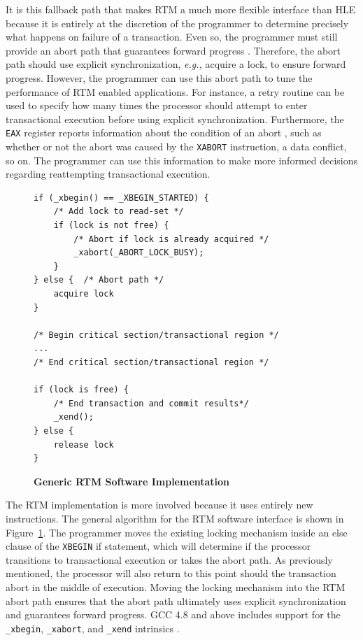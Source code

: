 \documentclass{sig-alternate}
\begin{document}
It is this fallback path that makes RTM a much more flexible interface than HLE because it
is entirely at the discretion of the programmer to determine precisely what happens on
failure of a transaction.  Even so, the programmer must still provide an abort path that
guarantees forward progress \cite{intel_prog_ref}.  Therefore, the abort path should use
explicit synchronization, \emph{e.g.,} acquire a lock, to ensure forward progress.
However, the programmer can use this abort path to tune the performance of RTM enabled
applications.  For instance, a retry routine can be used to specify how many times the
processor should attempt to enter transactional execution before using explicit
synchronization.  Furthermore, the \texttt{EAX} register reports information about the
condition of an abort \cite{intel_prog_ref}, such as whether or not the abort was caused
by the \texttt{XABORT} instruction, a data conflict, so on.  The programmer can use this
information to make more informed decisions regarding reattempting transactional
execution.

\begin{figure}
\begin{verbatim}
if (_xbegin() == _XBEGIN_STARTED) {
    /* Add lock to read-set */
    if (lock is not free) {
        /* Abort if lock is already acquired */
        _xabort(_ABORT_LOCK_BUSY);
    }
} else {  /* Abort path */
    acquire lock
}

/* Begin critical section/transactional region */
...
/* End critical section/transactional region */

if (lock is free) {
    /* End transaction and commit results*/
    _xend();
} else {    
    release lock    
}
\end{verbatim}
    \caption{\textbf{Generic RTM Software Implementation}}\label{fig:rtm_interface}
\end{figure}

The RTM implementation is more involved because it uses entirely new instructions.  The
general algorithm for the RTM software interface is shown in
Figure~\ref{fig:rtm_interface}.  The programmer moves the existing locking mechanism
inside an else clause of the \texttt{XBEGIN} if statement, which will determine if the
processor transitions to transactional execution or takes the abort path.  As previously
mentioned, the processor will also return to this point should the transaction abort in
the middle of execution.  Moving the locking mechanism into the RTM abort path ensures
that the abort path ultimately uses explicit synchronization and guarantees forward
progress.  GCC 4.8 and above includes support for the \texttt{\_xbegin},
\texttt{\_xabort}, and \texttt{\_xend} intrinsics \cite{gcc}.
\end{document}
